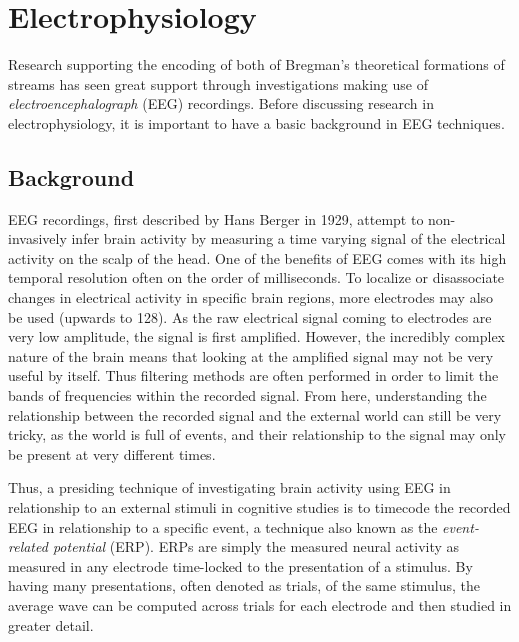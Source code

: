 \documentclass[a4paper,11pt,final]{ThesisStyle}
\begin{document}
\section{Electrophysiology}

Research supporting the encoding of both of Bregman's theoretical formations of streams has seen great support through investigations making use of \textit{electroencephalograph} (EEG) recordings.   Before discussing research in electrophysiology, it is important to have a basic background in EEG techniques.  

\subsection{Background}

EEG recordings, first described by Hans Berger in 1929, attempt to non-invasively infer brain activity by measuring a time varying signal of the electrical activity on the scalp of the head.  One of the benefits of EEG comes with its high temporal resolution often on the order of milliseconds.  To localize or disassociate changes in electrical activity in specific brain regions, more electrodes may also be used (upwards to 128).  As the raw electrical signal coming to electrodes are very low amplitude, the signal is first amplified.  However, the incredibly complex nature of the brain means that looking at the amplified signal may not be very useful by itself.  Thus filtering methods are often performed in order to limit the bands of frequencies within the recorded signal.  From here, understanding the relationship between the recorded signal and the external world can still be very tricky, as the world is full of events, and their relationship to the signal may only be present at very different times.  

Thus, a presiding technique of investigating brain activity using EEG in relationship to an external stimuli in cognitive studies is to timecode the recorded EEG in relationship to a specific event, a technique also known as the \textit{event-related potential} (ERP).  ERPs are simply the measured neural activity as measured in any electrode time-locked to the presentation of a stimulus.  By having many presentations, often denoted as trials, of the same stimulus, the average wave can be computed across trials for each electrode and then studied in greater detail.  
\end{document}
